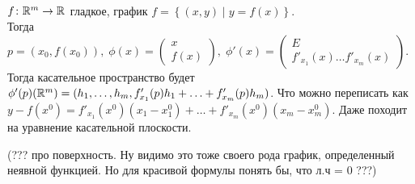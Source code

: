 \begin{Example*}{~\\}
	$f\colon\rmy\to\rmy[]$ гладкое, график $f=\left\{(x,y)\middle|y=f(x)\right\}$.\\
	Тогда $p=(x_0,f(x_0)),\;\phi(x)=\begin{pmatrix}
		x\\f(x)
	\end{pmatrix},\;\phi'(x)=\begin{pmatrix}
		E\\f'_{x_1}(x) \ldots f'_{x_m}(x)
	\end{pmatrix}$. Тогда касательное пространство будет $\phi'(p)(\rmy)=(h_1,\ldots,h_m,f'_{x_1}(p)h_1+\ldots+f'_{x_m}(p)h_m)$. Что можно переписать как $y-f(x^0)=f'_{x_1}(x^0)(x_1-x^0_1)+\ldots+f'_{x_m}(x^0)(x_m-x^0_m)$. Даже походит на уравнение касательной плоскости.
	
	
	(??? про поверхность. Ну видимо это тоже своего рода график, определенный неявной функцией. Но для красивой формулы понять бы, что л.ч = 0 ???)
\end{Example*}


\newpage
